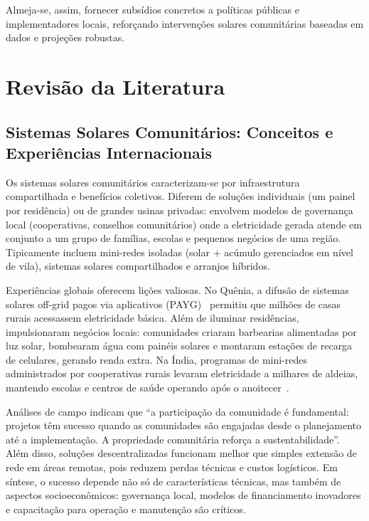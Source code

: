 \documentclass[12pt, a4paper]{article}
\begin{document}
Almeja-se, assim, fornecer subsídios concretos a políticas públicas e implementadores locais, reforçando intervenções solares comunitárias baseadas em dados e projeções robustas.

\section{Revisão da Literatura}

\subsection{Sistemas Solares Comunitários: Conceitos e Experiências Internacionais}

Os sistemas solares comunitários caracterizam-se por infraestrutura compartilhada e benefícios coletivos. Diferem de soluções individuais (um painel por residência) ou de grandes usinas privadas: envolvem modelos de governança local (cooperativas, conselhos comunitários) onde a eletricidade gerada atende em conjunto a um grupo de famílias, escolas e pequenos negócios de uma região. Tipicamente incluem mini-redes isoladas (solar + acúmulo gerenciados em nível de vila), sistemas solares compartilhados e arranjos híbridos.

Experiências globais oferecem lições valiosas. No Quênia, a difusão de sistemas solares off-grid pagos via aplicativos (PAYG)~\citep{Onyango2022} permitiu que milhões de casas rurais acessassem eletricidade básica. Além de iluminar residências, impulsionaram negócios locais: comunidades criaram barbearias alimentadas por luz solar, bombearam água com painéis solares e montaram estações de recarga de celulares, gerando renda extra. Na Índia, programas de mini-redes administrados por cooperativas rurais levaram eletricidade a milhares de aldeias, mantendo escolas e centros de saúde operando após o anoitecer~\citep{Mapako2021}.

Análises de campo indicam que ``a participação da comunidade é fundamental: projetos têm sucesso quando as comunidades são engajadas desde o planejamento até a implementação. A propriedade comunitária reforça a sustentabilidade''. Além disso, soluções descentralizadas funcionam melhor que simples extensão de rede em áreas remotas, pois reduzem perdas técnicas e custos logísticos. Em síntese, o sucesso depende não só de características técnicas, mas também de aspectos socioeconômicos: governança local, modelos de financiamento inovadores e capacitação para operação e manutenção são críticos.
\end{document}
